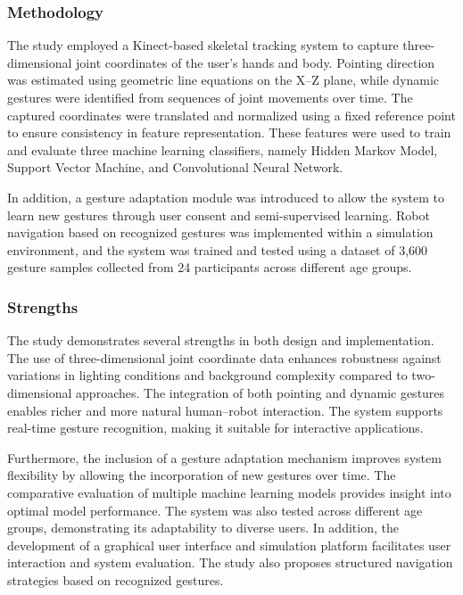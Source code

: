 \subsubsection{Methodology}

The study employed a Kinect-based skeletal tracking system to capture three-dimensional joint coordinates of the user’s hands and body. Pointing direction was estimated using geometric line equations on the X--Z plane, while dynamic gestures were identified from sequences of joint movements over time. The captured coordinates were translated and normalized using a fixed reference point to ensure consistency in feature representation. These features were used to train and evaluate three machine learning classifiers, namely Hidden Markov Model, Support Vector Machine, and Convolutional Neural Network.

In addition, a gesture adaptation module was introduced to allow the system to learn new gestures through user consent and semi-supervised learning. Robot navigation based on recognized gestures was implemented within a simulation environment, and the system was trained and tested using a dataset of 3,600 gesture samples collected from 24 participants across different age groups.

\subsubsection{Strengths}

The study demonstrates several strengths in both design and implementation. The use of three-dimensional joint coordinate data enhances robustness against variations in lighting conditions and background complexity compared to two-dimensional approaches. The integration of both pointing and dynamic gestures enables richer and more natural human--robot interaction. The system supports real-time gesture recognition, making it suitable for interactive applications.

Furthermore, the inclusion of a gesture adaptation mechanism improves system flexibility by allowing the incorporation of new gestures over time. The comparative evaluation of multiple machine learning models provides insight into optimal model performance. The system was also tested across different age groups, demonstrating its adaptability to diverse users. In addition, the development of a graphical user interface and simulation platform facilitates user interaction and system evaluation. The study also proposes structured navigation strategies based on recognized gestures.

